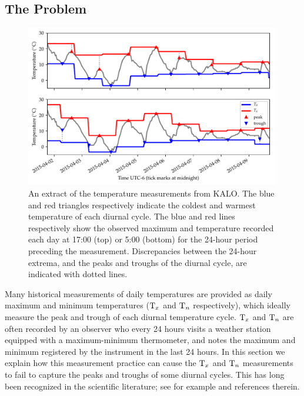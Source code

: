 \documentclass[12pt]{article}
\begin{document}
\subsection{The Problem} 
\label{sec:theproblem}
\label{sec:illustrate_bias}

\begin{figure}[tbp]
\centering
\includegraphics[height=0.4\textheight,width=0.99\textwidth,keepaspectratio]{../figures/waterloo_triangles.pdf}
\caption{
\label{fig:waterloo_triangles}
An extract of the temperature measurements from KALO.
The blue and red triangles respectively indicate the coldest and warmest temperature of each diurnal cycle.
The blue and red lines respectively show the observed maximum and temperature recorded each day at 17:00 (top) or 5:00 (bottom) for the 24-hour period preceding the measurement.
Discrepancies between the 24-hour extrema, and the peaks and troughs of the diurnal cycle, are indicated with dotted lines.
}
\end{figure}

Many historical measurements of daily temperatures are provided as daily maximum and minimum temperatures (\(\mathrm{T}_{x}\) and \(\mathrm{T}_{n}\) respectively), which ideally measure the peak and trough of each diurnal temperature cycle. 
\(\mathrm{T}_{x}\) and \(\mathrm{T}_{n}\) are often recorded by an observer who every 24 hours visits a weather station equipped with a maximum-minimum thermometer, and notes the maximum and minimum registered by the instrument in the last 24 hours.
In this section we explain how this measurement practice can cause the \(\mathrm{T}_{x}\) and \(\mathrm{T}_{n}\) measurements to fail to capture the peaks and troughs of some diurnal cycles.
This has long been recognized in the scientific literature; see for example \citet{baker1975effect} and references therein.
\end{document}
